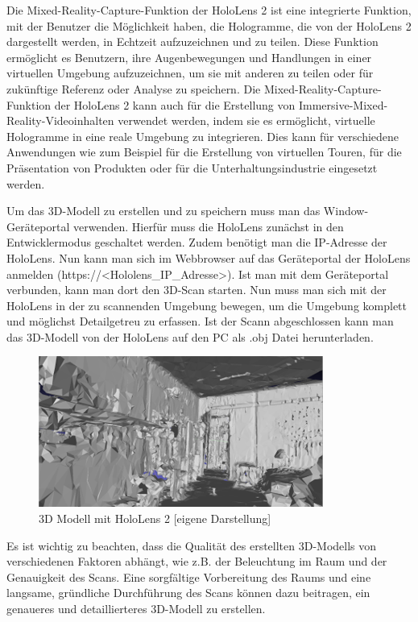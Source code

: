         Die Mixed-Reality-Capture-Funktion der HoloLens 2 ist eine integrierte Funktion, mit der Benutzer die Möglichkeit haben, die Hologramme, die von der HoloLens 2 dargestellt werden, in Echtzeit aufzuzeichnen und zu teilen. Diese Funktion ermöglicht es Benutzern, ihre Augenbewegungen und Handlungen in einer virtuellen Umgebung aufzuzeichnen, um sie mit anderen zu teilen oder für zukünftige Referenz oder Analyse zu speichern. Die Mixed-Reality-Capture-Funktion der HoloLens 2 kann auch für die Erstellung von Immersive-Mixed-Reality-Videoinhalten verwendet werden, indem sie es ermöglicht, virtuelle Hologramme in eine reale Umgebung zu integrieren. Dies kann für verschiedene Anwendungen wie zum Beispiel für die Erstellung von virtuellen Touren, für die Präsentation von Produkten oder für die Unterhaltungsindustrie eingesetzt werden.

        Um das 3D-Modell zu erstellen und zu speichern muss man das Window-Geräteportal verwenden. Hierfür muss die HoloLens zunächst in den Entwicklermodus geschaltet werden. Zudem benötigt man die IP-Adresse der HoloLens. Nun kann man sich im Webbrowser auf das Geräteportal der HoloLens anmelden (https://<Hololens\_IP\_Adresse>). Ist man mit dem Geräteportal verbunden, kann man dort den 3D-Scan starten. Nun muss man sich mit der HoloLens in der zu scannenden Umgebung bewegen, um die Umgebung komplett und möglichst Detailgetreu zu erfassen. Ist der Scann abgeschlossen kann man das 3D-Modell von der HoloLens auf den PC als .obj Datei herunterladen.

        \begin{figure}[H]
            \centering
            \includegraphics[scale=1]{images/modell_zimmer_hololens.png}
            \caption[3D Modell mit HoloLens 2]{\label{img modell_hololens} 3D Modell mit HoloLens 2 [eigene Darstellung]}
        \end{figure}

        Es ist wichtig zu beachten, dass die Qualität des erstellten 3D-Modells von verschiedenen Faktoren abhängt, wie z.B. der Beleuchtung im Raum und der Genauigkeit des Scans. Eine sorgfältige Vorbereitung des Raums und eine langsame, gründliche Durchführung des Scans können dazu beitragen, ein genaueres und detaillierteres 3D-Modell zu erstellen.
